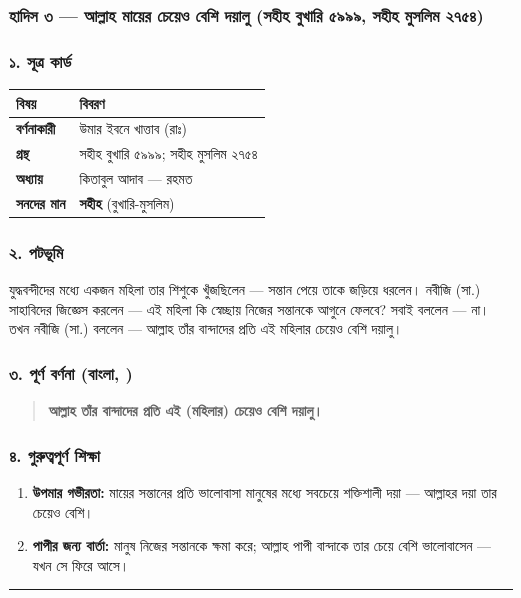 \subsubsection*{হাদিস ৩ — আল্লাহ মায়ের চেয়েও বেশি দয়ালু (সহীহ বুখারি ৫৯৯৯, সহীহ মুসলিম ২৭৫৪)}

\subsubsection*{১. সূত্র কার্ড}

\begin{table}[h]\centering\small
\begin{tabular}{ll}
বিষয় & বিবরণ \\
\hline
\textbf{বর্ণনাকারী} & উমার ইবনে খাত্তাব (রাঃ) \\
\textbf{গ্রন্থ} & সহীহ বুখারি ৫৯৯৯; সহীহ মুসলিম ২৭৫৪ \\
\textbf{অধ্যায়} & কিতাবুল আদাব — রহমত \\
\textbf{সনদের মান} & \textbf{সহীহ} (বুখারি-মুসলিম) \\
\hline
\end{tabular}
\end{table}

\subsubsection*{২. পটভূমি}

যুদ্ধবন্দীদের মধ্যে একজন মহিলা তার শিশুকে খুঁজছিলেন — সন্তান পেয়ে তাকে জড়িয়ে ধরলেন। নবীজি (সা.) সাহাবিদের জিজ্ঞেস করলেন — এই মহিলা কি স্বেচ্ছায় নিজের সন্তানকে আগুনে ফেলবে? সবাই বললেন — না। তখন নবীজি (সা.) বললেন — আল্লাহ তাঁর বান্দাদের প্রতি এই মহিলার চেয়েও বেশি দয়ালু।

\subsubsection*{৩. পূর্ণ বর্ণনা (বাংলা, )}

\begin{quote}
\textbf{আল্লাহ তাঁর বান্দাদের প্রতি এই (মহিলার) চেয়েও বেশি দয়ালু।}
\end{quote}

\subsubsection*{৪. গুরুত্বপূর্ণ শিক্ষা}

\begin{enumerate}
\item \textbf{উপমার গভীরতা:} মায়ের সন্তানের প্রতি ভালোবাসা মানুষের মধ্যে সবচেয়ে শক্তিশালী দয়া — আল্লাহর দয়া তার চেয়েও বেশি।
\item \textbf{পাপীর জন্য বার্তা:} মানুষ নিজের সন্তানকে ক্ষমা করে; আল্লাহ পাপী বান্দাকে তার চেয়ে বেশি ভালোবাসেন — যখন সে ফিরে আসে।
\end{enumerate}
\medskip\hrule\medskip

